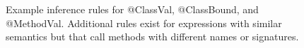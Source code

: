 \begin{figure}[t!]
\begin{center}
\begin{small}
\begin{lateximage}
\begin{tabular}{c}
\end{tabular}
\end{lateximage}
\end{small}
\end{center}
\caption{\label{fig:reflection-inference}%
Example inference rules for @ClassVal, @ClassBound, and @MethodVal.
Additional rules exist for expressions with similar semantics but that call
methods with different names or signatures.
}
\end{figure}
